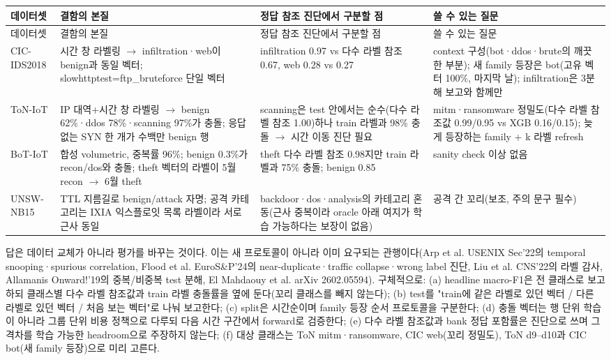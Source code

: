 \begingroup
\footnotesize
\begin{longtable}{>{\raggedright\arraybackslash}p{}>{\raggedright\arraybackslash}p{}>{\raggedright\arraybackslash}p{}>{\raggedright\arraybackslash}p{}}
\toprule
데이터셋 & 결함의 본질 & 정답 참조 진단에서 구분할 점 & 쓸 수 있는 질문 \\ \midrule
\endfirsthead
데이터셋 & 결함의 본질 & 정답 참조 진단에서 구분할 점 & 쓸 수 있는 질문 \\ \midrule
\endhead
{}CIC-IDS2018 & 시간 창 라벨링  \ensuremath{\rightarrow}  infiltration·web이 benign과 동일 벡터; slowhttptest=\allowbreak{}ftp\_\allowbreak{}bruteforce 단일 벡터 & infiltration 0.97 vs 다수 라벨 참조 0.67, web 0.28 vs 0.27 & context 구성(bot·ddos·brute의 깨끗한 부분); 새 family 등장은 bot(고유 벡터 100\%, 마지막 날); infiltration은 3분해 보고와 함께만 \\
{}ToN-IoT & IP 대역+\allowbreak{}시간 창 라벨링  \ensuremath{\rightarrow}  benign 62\%·ddos 78\%·scanning 97\%가 충돌; 응답 없는 SYN 한 개가 수백만 benign 행 & scanning은 test 안에서는 순수(다수 라벨 참조 1.00)하나 train 라벨과 98\% 충돌  \ensuremath{\rightarrow}  시간 이동 진단 필요 & mitm·ransomware 정밀도(다수 라벨 참조값 0.99/\allowbreak{}0.95 vs XGB 0.16/\allowbreak{}0.15); 늦게 등장하는 family +\allowbreak{} k 라벨 refresh \\
{}BoT-IoT & 합성 volumetric, 중복률 96\%; benign 0.3\%가 recon/\allowbreak{}dos와 충돌; theft 벡터의 라벨이 5월 recon \ensuremath{\rightarrow} 6월 theft & theft 다수 라벨 참조 0.98지만 train 라벨과 75\% 충돌; benign 0.85 & sanity check 이상 없음 \\
{}UNSW-NB15 & TTL 지름길로 benign/\allowbreak{}attack 자명; 공격 카테고리는 IXIA 익스플로잇 목록 라벨이라 서로 근사 동일 & backdoor·dos·analysis의 카테고리 혼동(근사 중복이라 oracle 아래 여지가 학습 가능하다는 보장이 없음) & 공격 간 꼬리(보조, 주의 문구 필수) \\
\bottomrule
\end{longtable}
\endgroup
답은 데이터 교체가 아니라 평가를 바꾸는 것이다. 이는 새 프로토콜이 아니라 이미 요구되는 관행이다(Arp et al. USENIX Sec'22의 temporal snooping·spurious correlation, Flood et al. EuroS\&P'24의 near-duplicate·traffic collapse·wrong label 진단, Liu et al. CNS'22의 라벨 감사, Allamanis Onward!'19의 중복/\allowbreak{}비중복 test 분해, El Mahdaouy et al. arXiv 2602.05594). 구체적으로: (a) headline macro-F1은 전 클래스로 보고하되 클래스별 다수 라벨 참조값과 train 라벨 충돌률을 옆에 둔다(꼬리 클래스를 빼지 않는다); (b) test를 "train에 같은 라벨로 있던 벡터 /\allowbreak{} 다른 라벨로 있던 벡터 /\allowbreak{} 처음 보는 벡터"로 나눠 보고한다; (c) split은 시간순이며 family 등장 순서 프로토콜을 구분한다; (d) 충돌 벡터는 행 단위 학습이 아니라 그룹 단위 비용 정책으로 다루되 다음 시간 구간에서 forward로 검증한다; (e) 다수 라벨 참조값과 bank 정답 포함률은 진단으로 쓰며 그 격차를 학습 가능한 headroom으로 주장하지 않는다; (f) 대상 클래스는 ToN mitm·ransomware, CIC web(꼬리 정밀도), ToN d9–d10과 CIC bot(새 family 등장)으로 미리 고른다.

